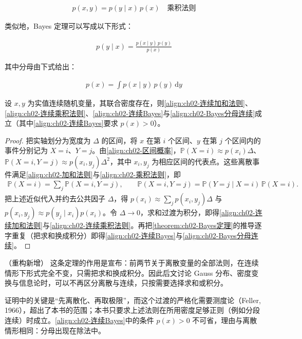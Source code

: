 \documentclass[../../main.tex]{subfiles}
\begin{document}
\begin{align}
  p(x,y) = p(y\mid x)\,p(x) \quad \text{乘积法则}
  \label{align:ch02-连续乘积法则}
\end{align}

类似地，Bayes 定理可以写成以下形式：

\begin{align}
  p(y\mid x) = \frac{p(x\mid y)\,p(y)}{p(x)}
  \label{align:ch02-连续Bayes}
\end{align}

其中分母由下式给出：

\begin{align}
  p(x) = \int p(x\mid y)\,p(y)\,\mathrm{d}y
  \label{align:ch02-Bayes分母连续}
\end{align}

\begin{theorem}\label{theorem:ch02-连续形式法则}
设 $x,y$ 为实值连续随机变量，其联合密度存在，则\eqref{align:ch02-连续加和法则}、\eqref{align:ch02-连续乘积法则}、\eqref{align:ch02-连续Bayes}与\eqref{align:ch02-Bayes分母连续}成立（其中\eqref{align:ch02-连续Bayes}要求 $p(x)>0$）。
\end{theorem}

\begin{proof}
把实轴划分为宽度为 $\Delta$ 的区间，将 $x$ 在第 $i$ 个区间、$y$ 在第 $j$ 个区间内的事件分别记为 $X=i$、$Y=j$。由\eqref{align:ch02-区间概率}，$\mathbb{P}(X=i)\approx p(x_i)\Delta$、$\mathbb{P}(X=i,Y=j)\approx p(x_i,y_j)\Delta^2$，其中 $x_i,y_j$ 为相应区间的代表点。这些离散事件满足\eqref{align:ch02-加和法则}与\eqref{align:ch02-乘积法则}，即
\begin{align*}
  \mathbb{P}(X=i) = \sum_{j}\mathbb{P}(X=i,Y=j),\qquad
  \mathbb{P}(X=i,Y=j) = \mathbb{P}(Y=j\mid X=i)\,\mathbb{P}(X=i) .
\end{align*}
把上述近似代入并约去公共因子 $\Delta$，得 $p(x_i)\approx\sum_j p(x_i,y_j)\Delta$ 与 $p(x_i,y_j)\approx p(y_j\mid x_i)p(x_i)$。令 $\Delta\to0$，求和过渡为积分，即得\eqref{align:ch02-连续加和法则}与\eqref{align:ch02-连续乘积法则}。再把\cref{theorem:ch02-Bayes定理}的推导逐字重复（把求和换成积分）即得\eqref{align:ch02-连续Bayes}与\eqref{align:ch02-Bayes分母连续}。
\end{proof}

\begin{remark}（重构新增）
这条定理的作用是宣布：前两节关于离散变量的全部法则，在连续情形下形式完全不变，只需把求和换成积分。因此后文讨论 Gauss 分布、密度变换与信息论时，可以不再区分离散与连续，只按需要选择求和或积分。

证明中的关键是“先离散化、再取极限”，而这个过渡的严格化需要测度论（Feller, 1966），超出了本书的范围；本书只要求上述法则在所用密度足够正则（例如分段连续）时成立。\eqref{align:ch02-连续Bayes}中的条件 $p(x)>0$ 不可省，理由与离散情形相同：分母出现在除法中。
\end{remark}
\end{document}
